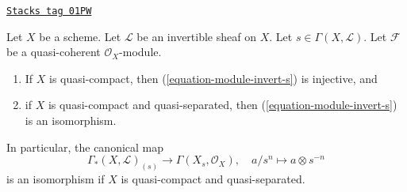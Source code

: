 \begin{lemma}
\label{properties-lemma-invert-s-sections}
\href{https://stacks.math.columbia.edu/tag/01PW}{\texttt{Stacks tag 01PW}}

\begin{reference}
\cite[Section 6.8]{EGA1-second}
\end{reference}
Let $X$ be a scheme. Let $\mathcal{L}$ be an invertible sheaf on $X$.
Let $s \in \Gamma(X, \mathcal{L})$. Let $\mathcal{F}$ be a quasi-coherent
$\mathcal{O}_X$-module.
\begin{enumerate}
\item If $X$ is quasi-compact, then (\ref{equation-module-invert-s})
is injective, and
\item if $X$ is quasi-compact and quasi-separated, then
(\ref{equation-module-invert-s}) is an isomorphism.
\end{enumerate}
In particular, the canonical map
$$
\Gamma_*(X, \mathcal{L})_{(s)}
\longrightarrow
\Gamma(X_s, \mathcal{O}_X),\quad
a/s^n \longmapsto a \otimes s^{-n}
$$
is an isomorphism if $X$ is quasi-compact and quasi-separated.
\end{lemma}

